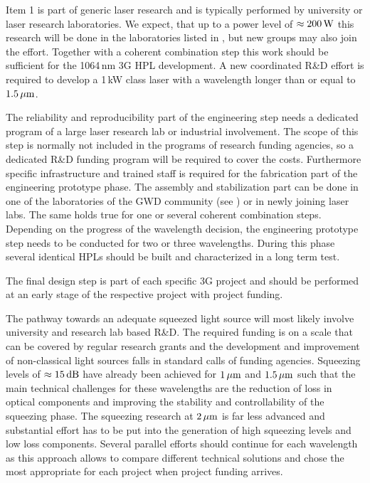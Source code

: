 \noindent Item 1 is part of generic laser research and is typically performed by university or laser research laboratories. We expect, that up to a power level of $ \approx 200 \, {\rm W} $ this research will be done in the laboratories listed in \cite{LightSource_RD_table}, but new groups may also join the effort. Together with a coherent combination step this work should be sufficient for the 1064\,nm 3G HPL development.
A new coordinated R\&D effort is required to develop a 1\,kW class laser with a wavelength longer than or equal to $ 1.5\, {\rm \mu m}$.

The reliability and reproducibility part of the engineering step needs a dedicated program of a large laser research lab or industrial involvement. The scope of this step is normally not included in the programs of research funding agencies, so a dedicated R\&D funding program will be required to cover the costs.
Furthermore specific infrastructure and trained staff is required for the fabrication part of the engineering prototype phase. The assembly and stabilization part can be done in one of the laboratories of the GWD community (see \cite{LightSource_RD_table}) or in newly joining laser labs. The same holds true for one or several coherent combination steps. Depending on the progress of the wavelength decision, the engineering prototype step needs to be conducted for two or three wavelengths. During this phase several identical HPLs should be built and characterized in a long term test.

The final design step is part of each specific 3G project and should be performed at an early stage of the respective project with project funding.

The pathway towards an adequate squeezed light source will most likely involve university and research lab based R\&D. The required funding is on a scale that can be covered by regular research grants and the development and improvement of non-classical light sources falls in standard calls of funding agencies. Squeezing levels of $ \approx 15 \, {\rm dB} $ have already been achieved for  $ 1\, {\rm \mu m}$ and  $ 1.5\, {\rm \mu m}$ such that the main technical challenges for these wavelengths are the reduction of loss in optical components and improving the stability and controllability of the squeezing phase. The squeezing research at $ 2\, {\rm \mu m}$ is far less advanced and substantial effort has to be put into the generation of high squeezing levels and low loss components. Several parallel efforts should continue for each wavelength as this approach allows to compare different technical solutions and chose the most appropriate for each project when project funding arrives.

